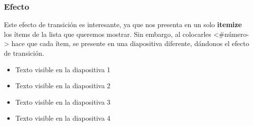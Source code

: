 \begin{frame}
\frametitle{Efecto}

Este efecto de transición es interesante, ya que nos presenta en un solo \textbf{itemize} los ítems de la lista que queremos mostrar. Sin embargo, al colocarles <\#número-> hace que cada ítem, se presente en una diapositiva diferente, dándonos el efecto de transición. 

\vspace{1cm}

\begin{itemize}
 \item<1-> Texto visible en la diapositiva 1
 \item<2-> Texto visible en la diapositiva 2
 \item<3-> Texto visible en la diapositiva 3
 \item<4-> Texto visible en la diapositiva 4
\end{itemize}

\end{frame}
